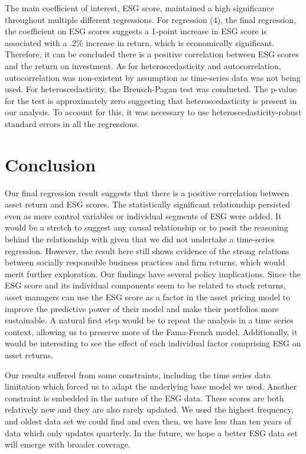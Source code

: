 \documentclass[man,natbib,floatsintext]{apa6}
\begin{document}
The main coefficient of interest, ESG score, maintained a high significance throughout multiple different regressions. For regression (4), the final regression, the coefficient on ESG scores suggests a 1-point increase in ESG score is associated with a .2\% increase in return, which is economically significant. Therefore, it can be concluded there is a positive correlation between ESG scores and the return on investment.
As for heteroscedasticity and autocorrelation, autocorrelation was non-existent by assumption as time-series data was not being used. For heteroscedasticity, the Breusch-Pagan test was conducted. The p-value for the test is approximately zero suggesting that heteroscedasticity is present in our analysis. To account for this, it was necessary to use heteroscedasticity-robust standard errors in all the regressions.


\section{\textbf{Conclusion}}
Our final regression result suggests that there is a positive correlation between asset return and ESG scores. The statistically significant relationship persisted even as more control variables or individual segments of ESG were added. It would be a stretch to suggest any causal relationship or to posit the reasoning behind the relationship with given that we did not undertake a time-series regression. However, the result here still shows evidence of the strong relations between socially responsible business practices and firm returns, which would merit further exploration. Our findings have several policy implications. Since the ESG score and its individual components seem to be related to stock returns, asset managers can use the ESG score as a factor in the asset pricing model to improve the predictive power of their model and make their portfolios more sustainable. A natural first step would be to repeat the analysis in a time series context, allowing us to preserve more of the Fama-French model. Additionally, it would be interesting to see the effect of each individual factor comprising ESG on asset returns. 

Our results suffered from some constraints, including the time series data limitation which forced us to adapt the underlying base model we used. Another constraint is embedded in the nature of the ESG data. These scores are both relatively new and they are also rarely updated. We used the highest frequency, and oldest data set we could find and even then, we have less than ten years of data which only updates quarterly. In the future, we hope a better ESG data set will emerge with broader coverage.
\end{document}
